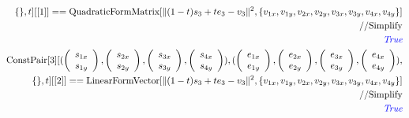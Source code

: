 \documentclass[8pt]{article}
\begin{document}
\begin{screen}
\begin{eqnarray*}
 \{\}, t][[1]] == \text{QuadraticFormMatrix}[\|(1-t)s_3 + t e_3 - v_3\|^2,\{v_{1x},v_{1y},v_{2x},v_{2y},v_{3x},v_{3y},v_{4x},v_{4y}\}]\\
// \text{Simplify}\\
\text{\it \color{blue}True}\\
\text{ConstPair}[3][(\left(\begin{array}{c}
s_{1x}\\
s_{1y}\\
\end{array}\right),\left(\begin{array}{c}
s_{2x}\\
s_{2y}\\
\end{array}\right),\left(\begin{array}{c}
s_{3x}\\
s_{3y}\\
\end{array}\right),\left(\begin{array}{c}
s_{4x}\\
s_{4y}\\
\end{array}\right)),(\left(\begin{array}{c}
e_{1x}\\
e_{1y}\\
\end{array}\right),\left(\begin{array}{c}
e_{2x}\\
e_{2y}\\
\end{array}\right),\left(\begin{array}{c}
e_{3x}\\
e_{3y}\\
\end{array}\right),\left(\begin{array}{c}
e_{4x}\\
e_{4y}\\
\end{array}\right)),\\
 \{\}, t][[2]] == \text{LinearFormVector}[\|(1-t)s_3 + t e_3 - v_3\|^2,\{v_{1x},v_{1y},v_{2x},v_{2y},v_{3x},v_{3y},v_{4x},v_{4y}\}]\\
// \text{Simplify}\\
\text{\it \color{blue}True}
\end{eqnarray*}
\end{screen}
\end{document}
